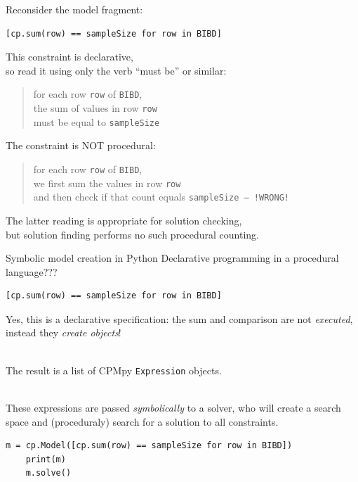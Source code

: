 \documentclass{cons-beamer}
\begin{document}
\begin{flashcardcpmpy}
\begin{frame}[fragile]
  Reconsider the model fragment:
  {\footnotesize
    \begin{lstlisting}[language=cpmpy,firstnumber=4]
    [cp.sum(row) == sampleSize for row in BIBD]\end{lstlisting}
  }

  This constraint is \alert{declarative}, \\
  so read it using only the verb ``must be'' or similar: \vfill
  \begin{quote}
    for each row \texttt{{row}} of \texttt{{BIBD}}, \\
    the sum of values in row \texttt{{row}} \\
    must be equal to \texttt{{sampleSize}}
  \end{quote}\vfill

  The constraint is \alert{NOT procedural}: \vfill
  \begin{quote}
    for each row \texttt{{row}} of \texttt{{BIBD}}, \\
    we first sum the values in row \texttt{{row}}\\
    and then check if that count equals \texttt{{sampleSize}}\texttt{~-- !WRONG!}
  \end{quote}\vfill
  The latter reading is appropriate for solution \alert{checking}, \\
  but solution \alert{finding} performs no such procedural counting.
\end{frame}

\begin{frame}[fragile]{Symbolic model creation in Python}
  Declarative programming in a procedural language???

  {\footnotesize
    \begin{lstlisting}[language=cpmpy,firstnumber=4]
    [cp.sum(row) == sampleSize for row in BIBD]\end{lstlisting}
  }

  \alert{Yes}, this is a declarative specification: the sum and comparison
  are not \textit{executed}, instead they \textit{create objects}!

  $ $\\ %
  The result is a list of CPMpy \texttt{Expression} objects.

  $ $\\ %
  These expressions are passed \textit{symbolically} to a solver, who will create a search space and (proceduraly) search for a solution to all constraints.
  
  {\footnotesize
    \begin{lstlisting}[language=cpmpy,firstnumber=14]
    m = cp.Model([cp.sum(row) == sampleSize for row in BIBD])
    print(m)
    m.solve()\end{lstlisting}
  }
\end{frame}
\end{flashcardcpmpy}
\end{document}
